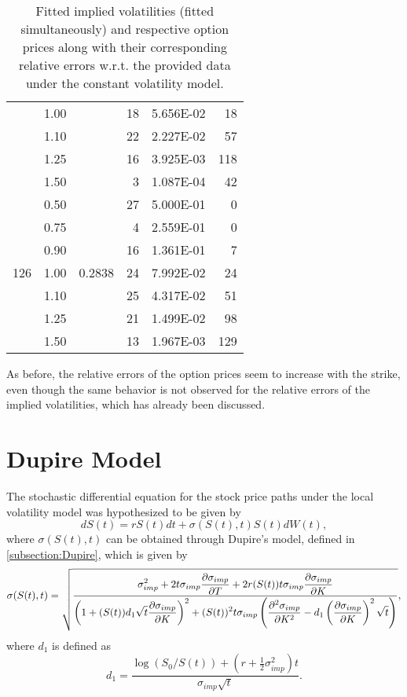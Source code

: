 \begin{table}[H]
\begin{tabular}{@{}cccrcr@{}}
 & 1.00 &  & 18 & \num{5.656E-02} & 18 \\
 & 1.10 &  & 22 & \num{2.227E-02} & 57 \\
 & 1.25 &  & 16 & \num{3.925E-03} & 118 \\
 & 1.50 &  & 3 & \num{1.087E-04} & 42 \\ \midrule
\multirow{7}{*}{126} & 0.50 & \multirow{7}{*}{0.2838} & 27 & \num{5.000E-01} & 0 \\
 & 0.75 &  & 4 & \num{2.559E-01} & 0 \\
 & 0.90 &  & 16 & \num{1.361E-01} & 7 \\
 & 1.00 &  & 24 & \num{7.992E-02} & 24 \\
 & 1.10 &  & 25 & \num{4.317E-02} & 51 \\
 & 1.25 &  & 21 & \num{1.499E-02} & 98 \\
 & 1.50 &  & 13 & \num{1.967E-03} & 129 \\ \bottomrule
\end{tabular}
  \caption[Fitted implied volatilities (fitted simultaneously) and respective option prices along with their corresponding relative errors w.r.t. the provided data under the constant volatility model.]{Fitted implied volatilities (fitted simultaneously) and respective option prices along with their corresponding relative errors w.r.t. the provided data under the constant volatility model.}
  \label{tab:CV2}
\end{table}

As before, the relative errors of the option prices seem to increase with the strike, even though the same behavior is not observed for the relative errors of the implied volatilities, which has already been discussed.

\vfill
\newpage

\section{Dupire Model}
\label{section:Dupire Model}
The stochastic differential equation for the stock price paths under the local volatility model was hypothesized to be given by
\begin{equation}\label{dupmodds}
dS(t)=rS(t)dt+\sigma(S(t),t)S(t)dW(t),
\end{equation}
\noindent where $\sigma(S(t),t)$ can be obtained through Dupire's model, defined in \autoref{subsection:Dupire}, which is given by
\begin{equation}\label{dupmodds2}
\sigma(S(t),t)=\sqrt{\frac{\displaystyle\sigma_{imp}^2+2t\sigma_{imp}\pdv{\sigma_{imp}}{T}+2r(S(t))t\sigma_{imp}\pdv{\sigma_{imp}}{K}}{\displaystyle\left(1+(S(t))d_1\sqrt{t}\pdv{\sigma_{imp}}{K}\right)^2+(S(t))^2t\sigma_{imp}\left(\pdv{^2\sigma_{imp}}{K^2}-d_1\left(\pdv{\sigma_{imp}}{K}\right)^2\sqrt{t}\right)}},
\end{equation}
\noindent where $d_1$ is defined as
\begin{equation}
d_1=\frac{\log(S_0/S(t))+\left(r+\frac{1}{2}\sigma_{imp}^2\right)t}{\sigma_{imp}\sqrt{t}}.
\end{equation}

